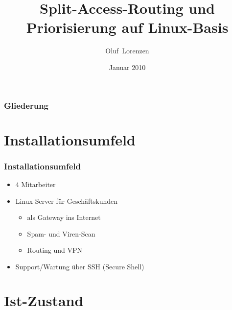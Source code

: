 \documentclass[14pt]{beamer}
\title{Split-Access-Routing und Priorisierung auf Linux-Basis}
\author{Oluf~Lorenzen\inst{}}
\institute
{
axxeo GmbH
}
\date{Januar 2010}
\begin{document}
\begin{frame}
\titlepage
\end{frame}

\begin{frame}
\frametitle{Gliederung}
\tableofcontents
\end{frame}

\section{Installationsumfeld}

\begin{frame}
\frametitle<presentation>{Installationsumfeld}
\begin{itemize}
 \item 4 Mitarbeiter
\item Linux-Server für Geschäftskunden
\begin{itemize}
 \item als Gateway ins Internet
\item Spam- und Viren-Scan
\item Routing und VPN
\end{itemize}
\item Support/Wartung über SSH (Secure Shell)
\end{itemize}

\end{frame}

\section{Ist-Zustand}
\end{document}
